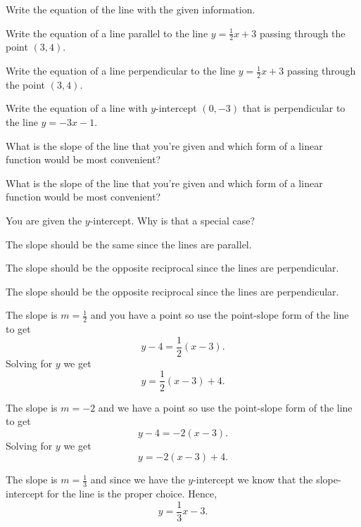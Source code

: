 \begin{activity}\label{A:0.1.4}
Write the equation of the line with the given information.
\ba
\item Write the equation of a line parallel to the line $y=\frac{1}{2}x+3$ passing through
    the point $(3,4)$.
\item Write the equation of a line perpendicular to the line $y=\frac{1}{2}x + 3$ passing
    through the point $(3,4)$.
\item Write the equation of a line with $y$-intercept $(0,-3)$ that is perpendicular to
    the line $y=-3x-1$.
\ea
\end{activity}
\begin{smallhint}
    \ba
        \item What is the slope of the line that you're given and which form of a linear
            function would be most convenient?
        \item What is the slope of the line that you're given and which form of a linear
            function would be most convenient?
        \item You are given the $y$-intercept.  Why is that a special case?
    \ea
\end{smallhint}
\begin{bighint}
    \ba
        \item The slope should be the same since the lines are parallel.
        \item The slope should be the opposite reciprocal since the lines are
            perpendicular.
        \item The slope should be the opposite reciprocal since the lines are
            perpendicular.
    \ea
\end{bighint}
\begin{activitySolution}
    \ba
        \item The slope is $m = \frac{1}{2}$ and you have a point so use the point-slope
            form of the line to get
            \[ y - 4 = \frac{1}{2} \left( x-3 \right). \]
            Solving for $y$ we get 
            \[ y = \frac{1}{2} \left( x-3 \right) + 4. \]
        \item The slope is $m = -2$ and we have a point so use the point-slope form of the
            line to get
            \[ y - 4 = -2 (x-3). \]
            Solving for $y$ we get 
            \[ y = -2(x-3) + 4. \]
        \item The slope is $m = \frac{1}{3}$ and since we have the $y$-intercept we know
            that the slope-intercept for the line is the proper choice.  Hence,
            \[ y = \frac{1}{3} x - 3. \]
    \ea
\end{activitySolution}



\aftera
